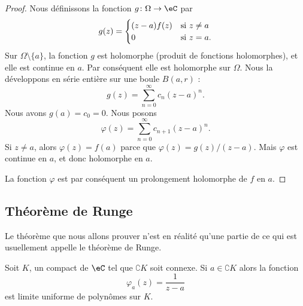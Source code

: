 \begin{proof}
    Nous définissons la fonction \( g\colon \Omega\to \eC\) par
    \begin{equation}
        g(z)=\begin{cases}
            (z-a)f(z)    &   \text{si \( z\neq a\)}\\
            0    &    \text{si \( z=a\)}.
        \end{cases}
    \end{equation}
    Sur \( \Omega\setminus\{ a \}\), la fonction \( g\) est holomorphe (produit de fonctions holomorphes), et elle est continue en \( a\). Par conséquent elle est holomorphe sur \( \Omega\). Nous la développons en série entière sur une boule \( B(a,r)\) :
    \begin{equation}
        g(z)=\sum_{n=0}^{\infty}c_n(z-a)^n.
    \end{equation}
    Nous avons \( g(a)=c_0=0\). Nous posons
    \begin{equation}
        \varphi(z)=\sum_{n=0}^{\infty}c_{n+1}(z-a)^n.
    \end{equation}
    Si \( z\neq a\), alors \( \varphi(z)=f(a)\) parce que \( \varphi(z)=g(z)/(z-a)\). Mais \( \varphi\) est continue en \( a\), et donc holomorphe en \( a\).

    La fonction \( \varphi\) est par conséquent un prolongement holomorphe de \( f\) en \( a\).
\end{proof}

\subsection{Théorème de Runge}

Le théorème que nous allons prouver n'est en réalité qu'une partie de ce qui est usuellement appelle le théorème de Runge.
\begin{theorem}     \label{ThoMvMCci}
    Soit \( K\), un compact de \( \eC\) tel que \( \complement K\) soit connexe. Si \( a\in \complement K\) alors la fonction 
    \begin{equation}
        \varphi_a(z)=\frac{1}{ z-a }
    \end{equation}
    est limite uniforme de polynômes sur \( K\).
\end{theorem}

